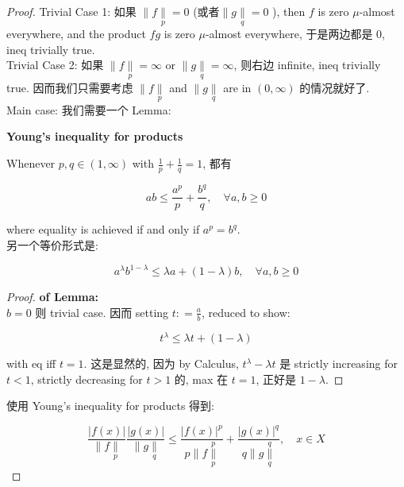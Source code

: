 \documentclass{qlnotes-export}
\begin{document}
\begin{proof}

Trivial Case 1: 如果 \(\parallel f\underset{p}{\parallel} = 0\) (或者\(\parallel g\underset{q}{\parallel} = 0\) ), then \(f\) is zero \(\mu\)-almost everywhere, and the product \(fg\) is zero \(\mu\)-almost everywhere, 于是两边都是 \(0\), ineq trivially true.\\
Trivial Case 2: 如果 \(\parallel f\underset{p}{\parallel} = \infty\) or \(\parallel g\underset{q}{\parallel} = \infty\), 则右边 infinite, ineq trivially true. 因而我们只需要考虑 \(\parallel f\underset{p}{\parallel}\) and \(\parallel g\underset{q}{\parallel}\) are in \((0,\infty)\) 的情况就好了.\\
Main case: 我们需要一个 Lemma:

\begin{lemma}{\protect{}\label{kn-young-s-inequality-for-products}{\textbf{Young's
inequality for products}}}

Whenever \(p,q \in (1,\infty)\) with \(\frac{1}{p} + \frac{1}{q} = 1\), 都有

\[ab \leq \frac{a^{p}}{p} + \frac{b^{q}}{q},\quad\forall a,b \geq 0\]

where equality is achieved if and only if \(a^{p} = b^{q}\).\\
另一个等价形式是:

\[a^{\lambda}b^{1 - \lambda} \leq \lambda a + (1 - \lambda)b,\quad\forall a,b \geq 0\]

\end{lemma}

\begin{proof}

\textbf{of Lemma:}\\
\(b = 0\) 则 trivial case. 因而 setting \(t: = \frac{a}{b}\), reduced to show:

\[t^{\lambda} \leq \lambda t + (1 - \lambda)\]

with eq iff \(t = 1\). 这是显然的, 因为 by Calculus, \(t^{\lambda} - \lambda t\) 是 strictly increasing for \(t < 1\), strictly decreasing for \(t > 1\) 的, max 在 \(t = 1\), 正好是 \(1 - \lambda\).

\end{proof}

使用 Young's inequality for products 得到:

\[\frac{|f(x)|}{\parallel f\underset{p}{\parallel}}\frac{|g(x)|}{\parallel g\underset{q}{\parallel}} \leq \frac{|f(x)|^{p}}{p \parallel f\underset{p}{\overset{p}{\parallel}}} + \frac{|g(x)|^{q}}{q \parallel g\underset{q}{\overset{q}{\parallel}}},\quad x \in X\]


\end{proof}
\end{document}
